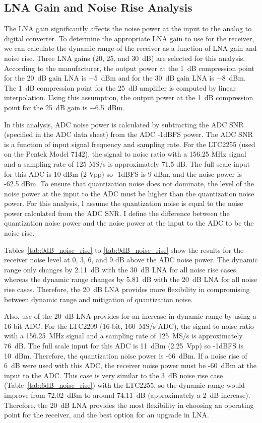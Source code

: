 \documentclass[12pt,letterpaper]{article}
\begin{document}
\subsection{LNA Gain and Noise Rise Analysis}

The LNA gain significantly affects the noise power at the input to the
analog to digital converter. To determine the appropriate LNA gain to
use for the receiver, we can calculate the dynamic range of the
receiver as a function of LNA gain and noise rise. Three LNA gains
(20, 25, and 30~dB) are selected for this analysis. According to the
manufacturer, the output power at the 1~dB compression point for the
20~dB gain LNA is $-$5~dBm and for the 30~dB gain LNA is $-$8~dBm. The
1~dB compression point for the 25~dB amplifier is computed by linear
interpolation. Using this assumption, the output power at the 1~dB
compression point for the 25~dB gain is $-$6.5~dBm.

In this analysis, ADC noise power is calculated by subtracting the ADC
SNR (specified in the ADC data sheet) from the ADC -1dBFS power. The
ADC SNR is a function of input signal frequency and sampling rate. For
the LTC2255 (used on the Pentek Model 7142), the signal to noise ratio
with a 156.25 MHz signal and a sampling rate of 125 MS/s is
approximately 71.5 dB. The full scale input for this ADC is 10 dBm (2
Vpp) so -1dBFS is 9 dBm, and the noise power is -62.5 dBm. To ensure
that quantization noise does not dominate, the level of the noise
power at the input to the ADC must be higher than the quantization
noise power. For this analysis, I assume the quantization noise is
equal to the noise power calculated from the ADC SNR. I define the
difference between the quantization noise power and the noise power at
the input to the ADC to be the noise rise.

Tables~\ref{tab:0dB_noise_rise} to \ref{tab:9dB_noise_rise} show the
results for the receiver noise level at 0, 3, 6, and 9 dB above the
ADC noise power. The dynamic range only changes by 2.11~dB with the
30~dB LNA for all noise rise cases, whereas the dynamic range changes
by 5.81~dB with the 20~dB LNA for all noise rise cases. Therefore, the
20~dB LNA provides more flexibility in compromising between dynamic
range and mitigation of quantization noise.

Also, use of the 20~dB LNA provides for an increase in dynamic range
by using a 16-bit ADC. For the LTC2209 (16-bit, 160~MS/s ADC), the
signal to noise ratio with a 156.25~MHz signal and a sampling rate of
125~MS/s is approximately 76~dB. The full scale input for this ADC is
11~dBm (2.25~Vpp) so -1dBFS is 10~dBm. Therefore, the quantization
noise power is -66~dBm. If a noise rise of 6~dB were used with this
ADC, the receiver noise power must be -60~dBm at the input to the
ADC. This case is very similar to the 3~dB noise rise case
(Table~\ref{tab:6dB_noise_rise}) with the LTC2255, so the dynamic
range would improve from 72.02~dBm to around 74.11~dB (approximately a
2~dB increase). Therefore, the 20~dB LNA provides the most flexibility
in choosing an operating point for the receiver, and the best option
for an upgrade in LNA.
\end{document}
